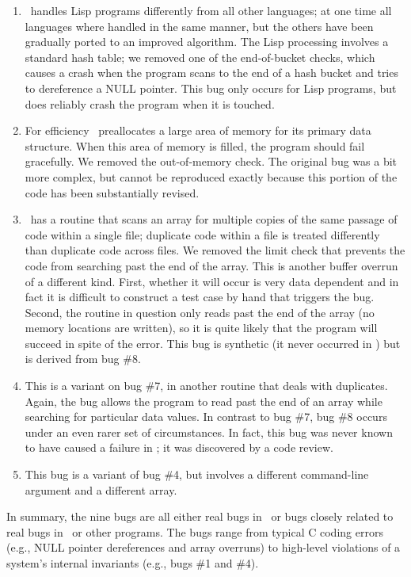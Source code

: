 \begin{enumerate}
\item \moss\ handles Lisp programs differently from all other languages;
at one time all languages where handled in the same manner, but the
others have been gradually ported to an improved algorithm.  The Lisp
processing involves a standard hash table; we removed one of the
end-of-bucket checks, which causes a crash when the program scans to
the end of a hash bucket and tries to dereference a NULL pointer.  This
bug only occurs for Lisp programs, but does reliably crash the program
when it is touched.

\item For efficiency \moss\ preallocates a large area of memory for its primary data structure.
When this area of memory is filled, the program should fail
gracefully.  We removed the out-of-memory check.  The original bug
was a bit more complex, but cannot be reproduced exactly because this
portion of the code has been substantially revised.  

\item \moss\ has a routine that scans an array for multiple copies of the same passage of code within
a single file; duplicate code within a file is treated differently than duplicate code across files.
We removed the limit check that prevents the code from searching past the end of the array.  This is another
buffer overrun of a different kind.  First, whether it will occur is very data dependent and in fact it is
difficult to construct a test case by hand that triggers the bug.  Second, the routine in question only reads
past the end of the array (no memory locations are written), so it is quite likely that the program will
succeed in spite of the error.  This bug is synthetic (it never occurred in \moss) but is derived from bug \#8.

\item This is a variant on bug \#7, in another routine that deals with duplicates.
Again, the bug allows the program to read past the end of an array
while searching for particular data values.  In contrast to bug \#7,
bug \#8 occurs under an even rarer set of circumstances.  In
fact, this bug was never known to have caused a failure in \moss; it
was discovered by a code review.

\item This bug is a variant of bug \#4, but involves a different command-line argument and
a different array.
\end{enumerate}

In summary, the nine bugs are all either real bugs in \moss\ or bugs
closely related to real bugs in \moss\ or other programs.  The bugs
range from typical C coding errors (e.g., NULL pointer dereferences
and array overruns) to high-level violations of a system's internal
invariants (e.g., bugs \#1 and \#4).

